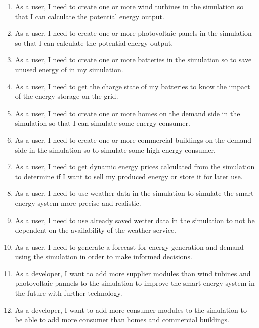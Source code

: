 \begin{enumerate}
\item As a user, I need to create one or more wind turbines in the simulation so that I can calculate the potential energy output.

\item As a user, I need to create one or more photovoltaic panels in the simulation so that I can calculate the potential energy output.

\item As a user, I need to create one or more batteries in the simulation so to save unused energy of in my simulation.

\item As a user, I need to get the charge state of my batteries to know the impact of the energy storage on the grid.

\item As a user, I need to create one or more homes on the demand side in the simulation so that I can simulate some energy consumer.

\item As a user, I need to create one or more commercial buildings on the demand side in the simulation so to simulate some high energy consumer.

\item As a user, I need to get dynamic energy prices calculated from the simulation to determine if I want to sell my produced energy or store it for later use.

\item As a user, I need to use weather data in the simulation to simulate the smart energy system more precise and realistic.

\item As a user, I need to use already saved wetter data in the simulation to not be dependent on the availability of the weather service.

\item As a user, I need to generate a forecast for energy generation and demand using the simulation in order to make informed decisions.

\item As a developer, I want to add more supplier modules than wind tubines and photovoltaic pannels to the simulation to improve the smart energy system in the future with further technology. 

\item As a developer, I want to add more consumer modules to the simulation to be able to add more consumer than homes and commercial buildings. 


\end{enumerate}
